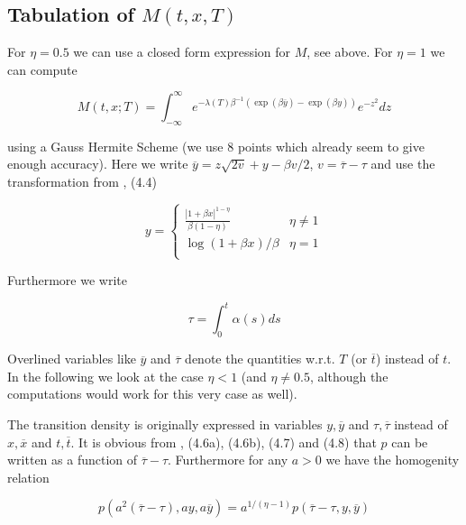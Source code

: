 \documentclass{amsart}
\theoremstyle{plain}
\numberwithin{equation}{section}
\begin{document}
\subsection{Tabulation of $M(t,x,T)$}

For $\eta=0.5$ we can use a closed form expression for $M$, see above. For $\eta=1$ we can compute

\begin{equation}\label{M_eta_1}
M(t,x;T) = \int_{-\infty}^\infty e^{-\lambda(T)\beta^{-1} (\exp(\beta \overline{y}) - \exp(\beta y))} e^{-z^2} dz
\end{equation}

using a Gauss Hermite Scheme (we use $8$ points which already seem to give enough accuracy). Here we write $\overline{y} = z\sqrt{2v} + y - \beta v / 2$, $v=\overline{\tau}-\tau$ and use the transformation from \cite{betaeta}, (4.4)

\begin{equation}
y = \begin{cases}
\frac{|1+\beta x|^{1-\eta}}{\beta(1-\eta)} & \eta\neq 1 \\
\log(1+\beta x)/\beta & \eta=1 \\
\end{cases}
\end{equation}

Furthermore we write 

\begin{equation}
\tau = \int_0^{t} \alpha(s) ds
\end{equation}

Overlined variables like $\overline{y}$ and $\overline{\tau}$ denote the quantities w.r.t. $T$ (or $\overline{t}$) instead of $t$. In the following we look at the case $\eta < 1$ (and $\eta \neq 0.5$, although the computations would work for this very case as well).

The transition density is originally expressed in variables $y, \overline{y}$ and $\tau, \overline{\tau}$ instead of $x, \overline{x}$ and $t, \overline{t}$. It is obvious from \cite{betaeta}, (4.6a), (4.6b), (4.7) and (4.8) that $p$ can be written as a function of $\overline{\tau}-\tau$. Furthermore for any $a > 0$ we have the homogenity relation

\begin{equation}\label{phom}
p\left(a^2(\overline{\tau}-\tau), ay, a\overline{y}\right) = a^{1/(\eta-1)} p\left(\overline{\tau}-\tau, y, \overline{y}\right)
\end{equation}
\end{document}
